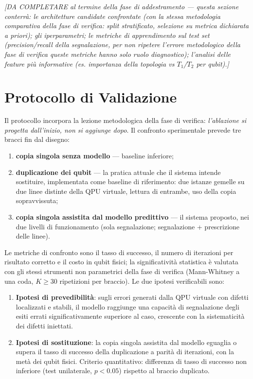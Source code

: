 \begin{onehalfspace}
\textit{[DA COMPLETARE al termine della fase di addestramento --- questa sezione conterrà: le architetture candidate confrontate (con la stessa metodologia comparativa della fase di verifica: split stratificato, selezione su metrica dichiarata a priori); gli iperparametri; le metriche di apprendimento sul test set (precision/recall della segnalazione, per non ripetere l'errore metodologico della fase di verifica queste metriche hanno solo ruolo diagnostico); l'analisi delle feature più informative (es. importanza della topologia vs $T_1$/$T_2$ per qubit).]}

\section{Protocollo di Validazione}
\label{sec:protocollo_validazione}

Il protocollo incorpora la lezione metodologica della fase di verifica: \emph{l'ablazione si progetta dall'inizio, non si aggiunge dopo}. Il confronto sperimentale prevede tre bracci fin dal disegno:

\begin{enumerate}
    \item[(a)] \textbf{copia singola senza modello} --- baseline inferiore;
    \item[(b)] \textbf{duplicazione dei qubit} --- la pratica attuale che il sistema intende sostituire, implementata come baseline di riferimento: due istanze gemelle su due linee distinte della QPU virtuale, lettura di entrambe, uso della copia sopravvissuta;
    \item[(c)] \textbf{copia singola assistita dal modello predittivo} --- il sistema proposto, nei due livelli di funzionamento (sola segnalazione; segnalazione + prescrizione delle linee).
\end{enumerate}

Le metriche di confronto sono il tasso di successo, il numero di iterazioni per risultato corretto e il costo in qubit fisici; la significatività statistica è valutata con gli stessi strumenti non parametrici della fase di verifica (Mann-Whitney a una coda, $K \geq 30$ ripetizioni per braccio). Le due ipotesi verificabili sono:

\begin{enumerate}
    \item \textbf{Ipotesi di prevedibilità}: sugli errori generati dalla QPU virtuale con difetti localizzati e stabili, il modello raggiunge una capacità di segnalazione degli esiti errati significativamente superiore al caso, crescente con la sistematicità dei difetti iniettati.
    \item \textbf{Ipotesi di sostituzione}: la copia singola assistita dal modello eguaglia o supera il tasso di successo della duplicazione a parità di iterazioni, con la metà dei qubit fisici. Criterio quantitativo: differenza di tasso di successo non inferiore (test unilaterale, $p < 0.05$) rispetto al braccio duplicato.
\end{enumerate}


\end{onehalfspace}
